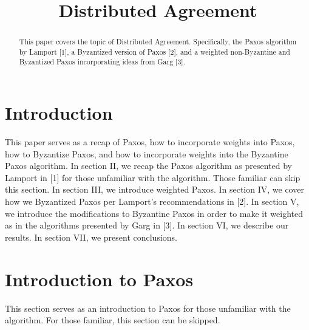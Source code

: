 \documentclass[conference]{IEEEtran}
\begin{document}
\title{Distributed Agreement\\
}

\author{
\and
{}
}

\maketitle

\begin{abstract}
This paper covers the topic of Distributed Agreement. Specifically, the Paxos algorithm by Lamport [1], a Byzantized version of Paxos [2], and a weighted non-Byzantine and Byzantized Paxos incorporating ideas from Garg [3].
\end{abstract}

\section{Introduction}
This paper serves as a recap of Paxos, how to incorporate weights into Paxos, how to Byzantize Paxos, and how to incorporate weights into the Byzantine Paxos algorithm. In section II, we recap the Paxos algorithm as presented by Lamport in [1] for those unfamiliar with the algorithm. Those familiar can skip this section. In section III, we introduce weighted Paxos. In section IV, we cover how we Byzantized Paxos per Lamport's recommendations in [2]. In section V, we introduce the modifications to Byzantine Paxos in order to make it weighted as in the algorithms presented by Garg in [3]. In section VI, we describe our results. In section VII, we present conclusions.

\section{Introduction to Paxos}
This section serves as an introduction to Paxos for those unfamiliar with the algorithm. For those familiar, this section can be skipped.
\end{document}
